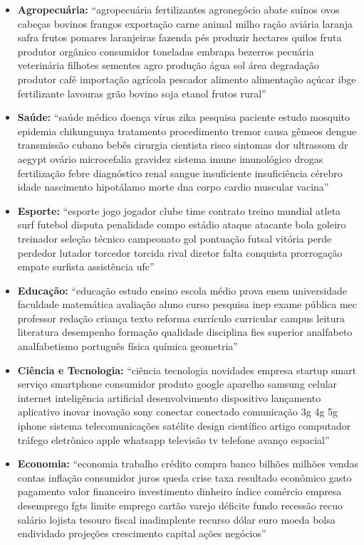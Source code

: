 \begin{itemize}
    \item \textbf{Agropecuária:} ``agropecuária fertilizantes agronegócio abate suínos ovos cabeças bovinos frangos exportação carne animal milho ração aviária laranja safra frutos pomares laranjeiras fazenda pés produzir hectares quilos fruta  produtor orgânico consumidor toneladas  embrapa bezerros pecuária veterinária filhotes sementes agro produção água sol área degradação produtor café importação agrícola pescador alimento alimentação açúcar ibge fertilizante lavouras grão bovino soja etanol frutos rural''
    \item \textbf{Saúde:} ``saúde médico doença vírus zika pesquisa paciente estudo mosquito epidemia chikungunya tratamento procedimento tremor causa gêmeos dengue transmissão cubano bebês cirurgia cientista risco sintomas dor ultrassom dr aegypt ovário microcefalia gravidez sistema imune imunológico drogas fertilização febre diagnóstico renal sangue insuficiente insuficiência cérebro idade nascimento hipotálamo morte dna corpo cardio muscular vacina''
    \item \textbf{Esporte:} ``esporte jogo jogador clube time contrato treino mundial atleta surf futebol disputa penalidade compo estádio ataque atacante bola goleiro treinador seleção técnico campeonato gol pontuação futsal vitória perde perdedor lutador torcedor torcida rival diretor falta conquista prorrogação empate surfista assistência ufc''
    \item \textbf{Educação:} ``educação estudo ensino escola médio prova enem universidade faculdade matemática avaliação aluno curso pesquisa inep exame pública mec professor redação criança texto reforma currículo curricular campus leitura literatura desempenho formação qualidade disciplina fies superior analfabeto analfabetismo português física química geometria''
    \item \textbf{Ciência e Tecnologia:} ``ciência tecnologia novidades empresa startup smart serviço smartphone consumidor produto google aparelho samsung celular internet inteligência artificial desenvolvimento dispositivo lançamento  aplicativo inovar inovação sony conectar conectado comunicação 3g 4g 5g iphone sistema telecomunicações satélite design científico artigo computador tráfego eletrônico apple whatsapp televisão tv telefone avanço espacial''
    \item \textbf{Economia:} ``economia trabalho crédito compra banco bilhões milhões vendas contas inflação consumidor juros queda crise taxa resultado econômico gasto pagamento valor financeiro investimento dinheiro índice comércio empresa desemprego fgts limite emprego cartão varejo déficite fundo recessão recuo salário lojista tesouro fiscal inadimplente recurso dólar euro moeda bolsa endividado projeções crescimento capital ações negócios''

\end{itemize}

